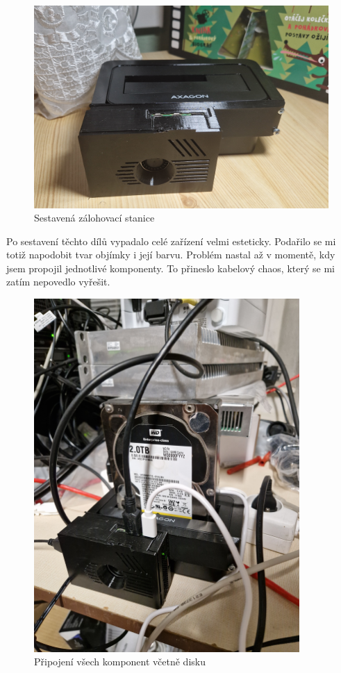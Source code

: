 \documentclass[a4paper,12pt, oneside]{book}
\begin{document}
\begin{figure}[h]
	\centering
	\includegraphics[width=1\textwidth]{img/skladani4-c.jpg}
	\caption{Sestavená zálohovací stanice}
	\end{figure}


Po sestavení těchto dílů vypadalo celé zařízení velmi esteticky. 
Podařilo se mi totiž napodobit tvar objímky i její barvu.
Problém nastal až v momentě, kdy jsem propojil jednotlivé komponenty. 
To přineslo kabelový chaos, který se mi zatím nepovedlo vyřešit.



\begin{figure}[h]
\centering
\includegraphics[width=0.9\textwidth]{img/zapojeni4.jpg}
\caption{Připojení všech komponent včetně disku}
\end{figure}
\end{document}
